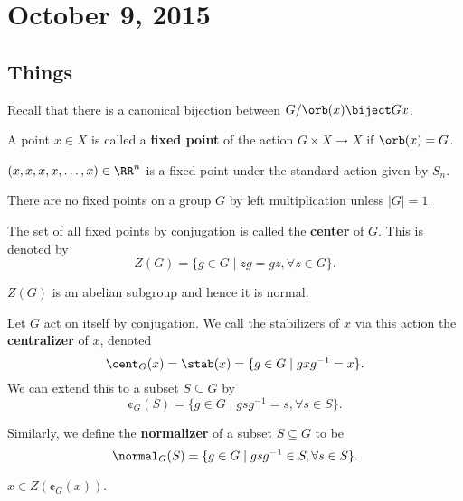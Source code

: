 \section{October 9, 2015}

\subsection{Things}
Recall that there is a canonical bijection between $G / \orb(x) \biject
Gx$.

\begin{df}
A point $x \in X$ is called a \textbf{fixed point} of the action $G
\times X \to X$ if $\orb(x) = G$.
\end{df}

\begin{ex}
$(x, x, x, x, \dots, x) \in \RR^n$ is a fixed point under the standard
action given by $S_n$.
\end{ex}

\begin{ex}
There are no fixed points on a group $G$ by left multiplication unless
$\lvert G \rvert = 1$.
\end{ex}

\begin{df}
The set of all fixed points by conjugation is called the \textbf{center}
of $G$. This is denoted by
\[ Z(G) = \lbrace g \in G \mid zg = gz, \forall z \in G \rbrace. \]
\end{df}

\begin{rem}
$Z(G)$ is an abelian subgroup and hence it is normal.
\end{rem}

\begin{df}
Let $G$ act on itself by conjugation. We call the stabilizers of $x$ via
this action the \textbf{centralizer} of $x$, denoted
\[ \cent_G(x) = \stab(x) = \lbrace g \in G \mid gxg^{-1} = x \rbrace. \]
We can extend this to a subset $S \subseteq G$ by
\[ \cent_G(S) = \lbrace g \in G \mid gsg^{-1} = s, \forall s \in S
\rbrace. \]
\end{df}

\begin{df}
Similarly, we define the \textbf{normalizer} of a subset $S \subseteq
G$ to be
\[ \normal_G(S) = \lbrace g \in G \mid gsg^{-1} \in S, \forall s \in S
\rbrace. \]
\end{df}

\begin{rem}
$x \in Z(\cent_G(x))$.
\end{rem}

